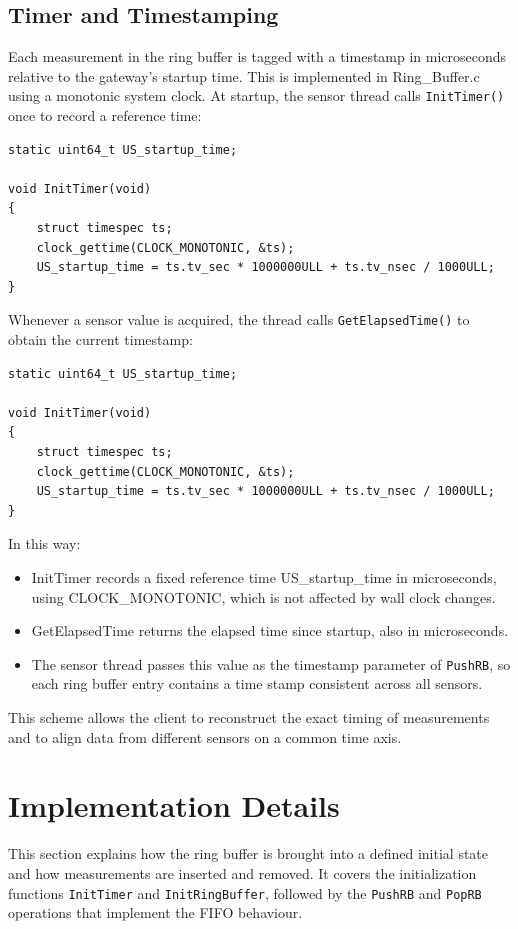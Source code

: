 \subsection{Timer and Timestamping}
Each measurement in the ring buffer is tagged with a timestamp in microseconds relative to the gateway's startup time. This is implemented in Ring\_Buffer.c using a monotonic system clock.
At startup, the sensor thread calls \texttt{InitTimer()} once to record a reference time:

\begin{verbatim}
static uint64_t US_startup_time;

void InitTimer(void)
{
    struct timespec ts;
    clock_gettime(CLOCK_MONOTONIC, &ts);
    US_startup_time = ts.tv_sec * 1000000ULL + ts.tv_nsec / 1000ULL;
}
\end{verbatim}

Whenever a sensor value is acquired, the thread calls \texttt{GetElapsedTime()} to obtain the current timestamp:

\begin{verbatim}
static uint64_t US_startup_time;

void InitTimer(void)
{
    struct timespec ts;
    clock_gettime(CLOCK_MONOTONIC, &ts);
    US_startup_time = ts.tv_sec * 1000000ULL + ts.tv_nsec / 1000ULL;
}
\end{verbatim}

In this way:
\begin{itemize}
\item InitTimer records a fixed reference time US\_startup\_time in microseconds, using CLOCK\_MONOTONIC, which is not affected by wall clock changes.
\item GetElapsedTime returns the elapsed time since startup, also in microseconds.
\item The sensor thread passes this value as the timestamp parameter of \texttt{PushRB}, so each ring buffer entry contains a time stamp consistent across all sensors.
\end{itemize}
This scheme allows the client to reconstruct the exact timing of measurements and to align data from different sensors on a common time axis.

\section{Implementation Details}
This section explains how the ring buffer is brought into a defined initial state and how measurements are inserted and removed. It covers the initialization functions \texttt{InitTimer} and \texttt{InitRingBuffer}, followed by the \texttt{PushRB} and \texttt{PopRB} operations that implement the FIFO behaviour.

